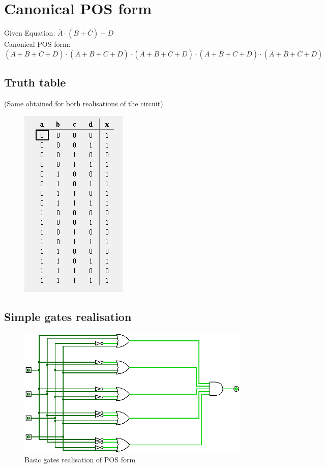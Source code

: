 \documentclass[12pt]{article}
\begin{document}
\section*{Canonical POS form}
Given Equation: \(\bar{A}\cdot(B+\bar{C})+D\)\\
Canonical POS form: $$(A+B+\bar{C}+D)\cdot(\bar{A}+B+C+D)\cdot(\bar{A}+B+\bar{C}+D)\cdot(\bar{A}+\bar{B}+C+D)\cdot(\bar{A}+\bar{B}+\bar{C}+D)$$
\subsection*{Truth table}
(Same obtained for both realisations of the circuit)
\begin{center}
    \begin{figure}[ht]
        \includegraphics[scale=0.80]{TT.jpg}
    \end{figure}
\end{center}
\newpage
\subsection*{Simple gates realisation}
\begin{center}
    \begin{figure}[ht]
        \includegraphics[scale=0.55]{POS_basic.png}
        \caption{Basic gates realisation of POS form}
    \end{figure}
\end{center}
\newpage
\end{document}
